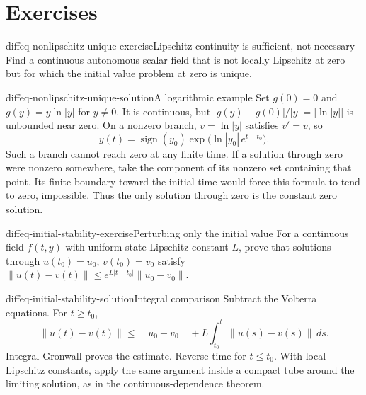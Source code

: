 \documentclass[preview]{standalone}
\begin{document}
\genpage
\section{Exercises}

\begin{snippetexercise}{diffeq-nonlipschitz-unique-exercise}{Lipschitz continuity is sufficient, not necessary}
    Find a continuous autonomous scalar field that is not locally Lipschitz
    at zero but for which the initial value problem at zero is unique.
\end{snippetexercise}

\begin{snippetsolution}{diffeq-nonlipschitz-unique-solution}{A logarithmic example}
    Set \(g(0)=0\) and \(g(y)=y\ln|y|\) for \(y\neq0\).
    It is continuous, but \(|g(y)-g(0)|/|y|=|\ln|y||\) is unbounded near zero.
    On a nonzero branch, \(v=\ln|y|\) satisfies \(v'=v\), so
    \[
        y(t)=\operatorname{sign}(y_0)
        \exp\bigl(\ln|y_0|\,e^{t-t_0}\bigr).
    \]
    Such a branch cannot reach zero at any finite time.
    If a solution through zero were nonzero somewhere, take the component
    of its nonzero set containing that point. Its finite boundary toward
    the initial time would force this formula to tend to zero, impossible.
    Thus the only solution through zero is the constant zero solution.
\end{snippetsolution}

\begin{snippetexercise}{diffeq-initial-stability-exercise}{Perturbing only the initial value}
    For a continuous field \(f(t,y)\) with uniform state Lipschitz constant \(L\),
    prove that solutions through \(u(t_0)=u_0\), \(v(t_0)=v_0\) satisfy
    \(\|u(t)-v(t)\|\leq e^{L|t-t_0|}\|u_0-v_0\|\).
\end{snippetexercise}

\begin{snippetsolution}{diffeq-initial-stability-solution}{Integral comparison}
    Subtract the Volterra equations. For \(t\geq t_0\),
    \[
        \|u(t)-v(t)\|\leq\|u_0-v_0\|
           +L\int_{t_0}^t\|u(s)-v(s)\|\,ds.
    \]
    Integral Gronwall proves the estimate. Reverse time for \(t\leq t_0\).
    With local Lipschitz constants, apply the same argument inside a compact
    tube around the limiting solution, as in the continuous-dependence theorem.
\end{snippetsolution}
\end{document}
